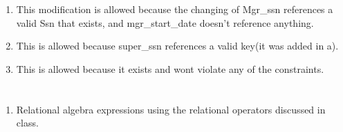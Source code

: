 \documentclass[12pt]{article}
\newcounter{num}
\begin{document}
\begin{enumerate}
\begin{enumerate}
    \item This modification is allowed because the changing of Mgr\_ssn references a valid Ssn that exists, and mgr\_start\_date doesn't reference anything.
    \item This is allowed because super\_ssn references a valid key(it was added in a).
    \item This is allowed because it exists and wont violate any of the constraints.
\end{enumerate}
\end{enumerate}
\newpage
\section{}
\begin{enumerate}
    \item Relational algebra expressions using the relational operators discussed in class.
    

\end{enumerate}
\end{document}
